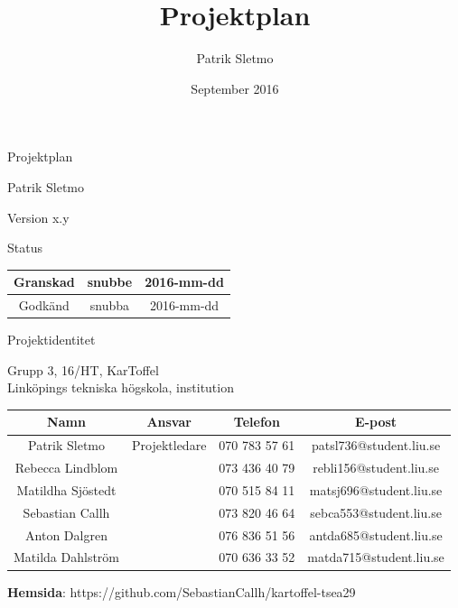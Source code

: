 \documentclass{article}
\title{Projektplan}
\author{Patrik Sletmo}
\date{September 2016}
\begin{document}
\graphicspath{{./images/}}

\thispagestyle{empty}

{
\sffamily
\centering
\large


{\huge
Projektplan
}

{\large
Patrik Sletmo
}

{\large
Version x.y
}

\vspace{13.5cm}

Status
\begin{center}
\begin{tabular}{ | c | c | c | }
\hline
Granskad & snubbe & 2016-mm-dd \\
\hline
Godkänd & snubba & 2016-mm-dd\\
\hline
\end{tabular}
\end{center}
}

\clearpage

\vspace*{\fill}
{
\sffamily
\centering
\large


{\huge
Projektidentitet
}

{\large
Grupp 3, 16/HT, KarToffel \\ Linköpings tekniska högskola, institution
}

\vspace{0.5cm}

\begin{table}[H]
\centering
\begin{tabular}{ | c | c | c | c |}
\hline
Namn & Ansvar & Telefon & E-post \\
\hline
Patrik Sletmo & Projektledare & 070 783 57 61 & patsl736@student.liu.se \\
\hline
Rebecca Lindblom &  & 073 436 40 79 & rebli156@student.liu.se \\
\hline
Matildha Sjöstedt &  & 070 515 84 11 & matsj696@student.liu.se \\
\hline
Sebastian Callh &  & 073 820 46 64 & sebca553@student.liu.se \\
\hline
Anton Dalgren &  & 076 836 51 56 & antda685@student.liu.se \\
\hline
Matilda Dahlström &  & 070 636 33 52 & matda715@student.liu.se \\
\hline
\end{tabular}
\end{table}
}

\begin{center}
\textbf{Hemsida}: https://github.com/SebastianCallh/kartoffel-tsea29
\end{center}
\end{document}
